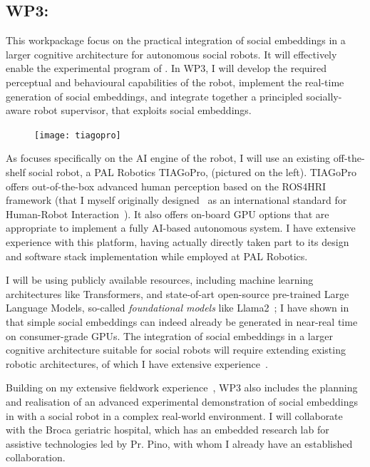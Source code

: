 \subsection{WP3: \textbf{\wpThree}}

This workpackage focus on the practical integration of social embeddings in a
larger cognitive architecture for autonomous social robots. It will effectively
enable the experimental program of \project.  In WP3, I will develop the
required perceptual and behavioural capabilities of the robot, implement the
real-time generation of social embeddings, and integrate together a principled
socially-aware robot supervisor, that exploits social embeddings.

\begin{figure}
    \centering
    \vspace{-10pt}
    \texttt{[image: tiagopro]}
    \label{fig:tiagopro}
\end{figure}

As \project focuses specifically on the AI engine of the robot, I will use an
existing off-the-shelf social robot, a PAL Robotics TIAGoPro,
(pictured on the left). TIAGoPro offers out-of-the-box advanced human perception
based on the ROS4HRI framework (that I myself originally
designed~\cite{mohamed2021ros4hri} as an international standard for Human-Robot
Interaction~\cite{lemaignan2022ros}). It also offers on-board GPU options that
are appropriate to implement a fully AI-based autonomous system. I have
extensive experience with this platform, having actually directly taken part to
its design and software stack implementation while employed at PAL Robotics.

I will be using publicly available resources, including machine
learning architectures like Transformers, and state-of-art open-source
pre-trained Large Language Models, so-called \emph{foundational models} like
Llama2~\cite{touvron2023llama}; I have shown in~\cite{lemaignan2024social} that
simple social embeddings can indeed already be generated in near-real time on
consumer-grade GPUs. The integration of social embeddings in a larger cognitive
architecture suitable for social robots will require extending existing
robotic architectures, of which I have extensive
experience~\cite{lemaignan2017artificial, lemaignan2015pyrobots,lemaignan2011what}.

Building on my extensive fieldwork
experience~\cite{hood2015when,mondada2015ranger,winkle2018social,cooper2023challenges},
WP3 also includes the planning and realisation of an advanced experimental
demonstration of social embeddings in with a social robot in a complex
real-world environment. I will collaborate with the Broca geriatric hospital,
which has an embedded research lab for assistive technologies led by Pr. Pino,
with whom I already have an established collaboration.

